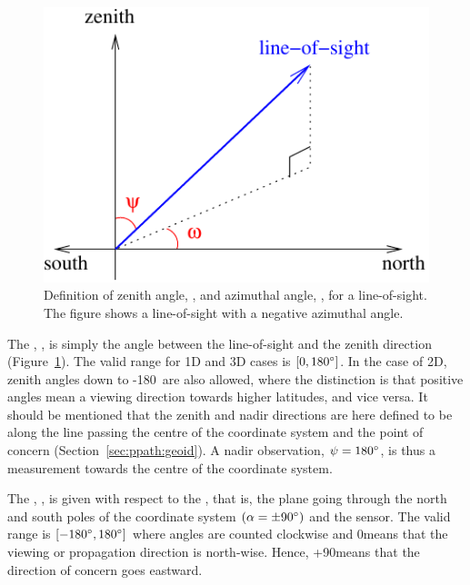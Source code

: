 \begin{figure}[!t]
 \begin{center}
  \begin{minipage}[c]{0.6\textwidth}
   \includegraphics*[width=0.99\hsize]{Figs/fm_definitions/za_and_aa_angles}
  \end{minipage}%
  \begin{minipage}[c]{0.4\textwidth}
   \caption{Definition of zenith angle, \ZntAng, and azimuthal angle, 
       \AzmAng, for a line-of-sight. The figure shows a line-of-sight
       with a negative azimuthal angle.}
   \label{fig:fm_defs:los}
  \end{minipage}
 \end{center}
\end{figure}           
 
The , \ZntAng, is simply the angle between the
line-of-sight and the zenith direction (Figure~\ref{fig:fm_defs:los}).
The valid range for 1D and 3D cases is $[0,180^\circ]$. In the case
of 2D, zenith angles down to -180\degree\ are also allowed, where the
distinction is that positive angles mean a viewing direction towards
higher latitudes, and vice versa. It should be mentioned that the
zenith and nadir directions are here defined to be along the line
passing the centre of the coordinate system and the point of concern
(Section~\ref{sec:ppath:geoid}). A nadir observation,
$\psi=180^\circ$, is thus a measurement towards the centre of the
coordinate system.

The , \AzmAng, is given with respect to the
, that is, the plane going through the north
and south poles of the coordinate system $(\alpha=\pm90^\circ)$ and the
sensor. The valid range is $[-180^\circ,180^\circ]$ where angles are
counted clockwise and 0\degree means that the viewing or propagation
direction is north-wise.  Hence, +90\degree means that the direction
of concern goes eastward.

